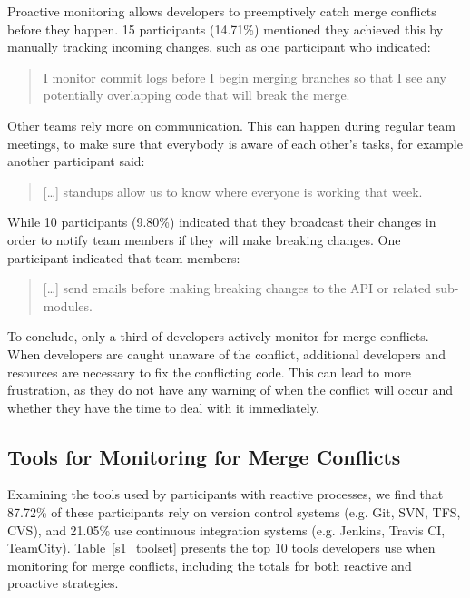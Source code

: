 Proactive monitoring allows developers to preemptively catch merge conflicts before they happen.
15 participants (14.71\%) mentioned they achieved this by manually tracking incoming changes, such as one participant who indicated:
\begin{quotation}
	I monitor commit logs before I begin merging branches so that I see any potentially overlapping code that will break the merge.
\end{quotation}
Other teams rely more on communication.
This can happen during regular team meetings, to make sure that everybody is aware of each other's tasks, for example another participant said:
\begin{quotation}
	[\ldots] standups allow us to know where everyone is working that week.
\end{quotation}
While 10 participants (9.80\%) indicated that they broadcast their changes in order to notify team members if they will make breaking changes.
One participant indicated that team members:
\begin{quotation}
	[\ldots] send emails before making breaking changes to the API or related sub-modules.
\end{quotation}

To conclude, only a third of developers actively monitor for merge conflicts.
When developers are caught unaware of the conflict, additional developers and resources are necessary to fix the conflicting code.
This can lead to more frustration, as they do not have any warning of when the conflict will occur and whether they have the time to deal with it immediately.

\subsection{Tools for Monitoring for Merge Conflicts}

Examining the tools used by participants with reactive processes, we find that 87.72\% of these participants rely on version control systems (e.g. Git, SVN, TFS, CVS), and 21.05\% use continuous integration systems (e.g. Jenkins, Travis CI, TeamCity).
Table~\ref{s1_toolset} presents the top 10 tools developers use when monitoring for merge conflicts, including the totals for both reactive and proactive strategies.

